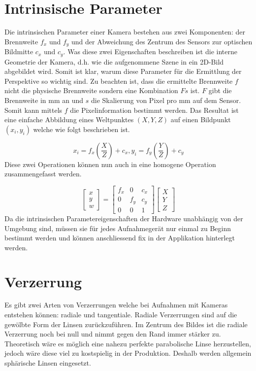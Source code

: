 \section{Intrinsische Parameter}
Die intrinsischen Parameter einer Kamera bestehen aus zwei Komponenten: der Brennweite $f_x$ und $f_y$ und der Abweichung des Zentrum des Sensors zur optischen Bildmitte $c_x$ und $c_y$. Was diese zwei Eigenschaften beschreiben ist die interne Geometrie der Kamera, d.h. wie die aufgenommene Szene in ein 2D-Bild abgebildet wird. Somit ist klar, warum diese Parameter für die Ermittlung der Perspektive so wichtig sind. Zu beachten ist, dass die ermittelte Brennweite $f$ nicht die physische Brennweite sondern eine Kombination $Fs$ ist. $F$ gibt die Brennweite in mm an und $s$ die Skalierung von Pixel pro mm auf dem Sensor. Somit kann mittels $f$ die Pixelinformation bestimmt werden. Das Resultat ist eine einfache Abbildung eines Weltpunktes $(X, Y, Z)$ auf einen Bildpunkt $(x_i, y_i)$ welche wie folgt beschrieben ist.

\begin{equation}
x_i = f_x (\frac{X}{Z}) + c_x,   y_i = f_y (\frac{Y}{Z}) + c_y
\end{equation}
\noindent
Diese zwei Operationen können nun auch in eine homogene Operation zusammengefasst werden.

\begin{equation}
\begin{bmatrix}
x \\ y \\ w
\end{bmatrix} 
=
\begin{bmatrix}
f_x & 0 & c_x \\
0 & f_y & c_y \\
0 & 0 & 1
\end{bmatrix} 
\begin{bmatrix}
X \\ Y \\ Z
\end{bmatrix} 
\end{equation}
\noindent
Da die intrinsischen Parametereigenschaften der Hardware unabhängig von der Umgebung sind, müssen sie für jedes Aufnahmegerät nur einmal zu Beginn bestimmt werden und können anschliessend fix in der Applikation hinterlegt werden.

\section{Verzerrung}
Es gibt zwei Arten von Verzerrungen welche bei Aufnahmen mit Kameras entstehen können: radiale und tangentiale. Radiale Verzerrungen sind auf die gewölbte Form der Linsen zurückzuführen. Im Zentrum des Bildes ist die radiale Verzerrung noch bei null und nimmt gegen den Rand immer stärker zu. Theoretisch wäre es möglich eine nahezu perfekte parabolische Linse herzustellen, jedoch wäre diese viel zu kostspielig in der Produktion. Deshalb werden allgemein sphärische Linsen eingesetzt.

